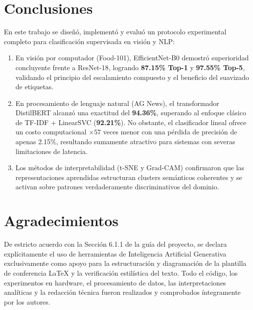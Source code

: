 \documentclass[conference]{IEEEtran}
\begin{document}
\section{Conclusiones}
En este trabajo se diseñó, implementó y evaluó un protocolo experimental completo para clasificación supervisada en visión y NLP:
\begin{enumerate}
    \item En visión por computador (Food-101), EfficientNet-B0 demostró superioridad concluyente frente a ResNet-18, logrando \textbf{87.15\% Top-1} y \textbf{97.55\% Top-5}, validando el principio del escalamiento compuesto y el beneficio del suavizado de etiquetas.
    \item En procesamiento de lenguaje natural (AG News), el transformador DistilBERT alcanzó una exactitud del \textbf{94.36\%}, superando al enfoque clásico de TF-IDF + LinearSVC (\textbf{92.21\%}). No obstante, el clasificador lineal ofrece un costo computacional $\times 57$ veces menor con una pérdida de precisión de apenas 2.15\%, resultando sumamente atractivo para sistemas con severas limitaciones de latencia.
    \item Los métodos de interpretabilidad (t-SNE y Grad-CAM) confirmaron que las representaciones aprendidas estructuran clusters semánticos coherentes y se activan sobre patrones verdaderamente discriminativos del dominio.
\end{enumerate}

\section*{Agradecimientos}
De estricto acuerdo con la Sección 6.1.1 de la guía del proyecto, se declara explícitamente el uso de herramientas de Inteligencia Artificial Generativa exclusivamente como apoyo para la estructuración y diagramación de la plantilla de conferencia \LaTeX{} y la verificación estilística del texto. Todo el código, los experimentos en hardware, el procesamiento de datos, las interpretaciones analíticas y la redacción técnica fueron realizados y comprobados íntegramente por los autores.
\end{document}

